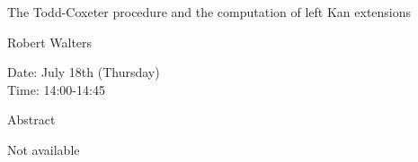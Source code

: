\begin{center}
\LARGE
The Todd-Coxeter procedure and the computation of left
                         Kan extensions
\end{center}

\begin{center}
\Large
Robert Walters
\end{center}

\noindent
Date:  July 18th (Thursday)\\
Time:  14:00-14:45\\

\begin{center}
\large
Abstract
\end{center}

Not available
